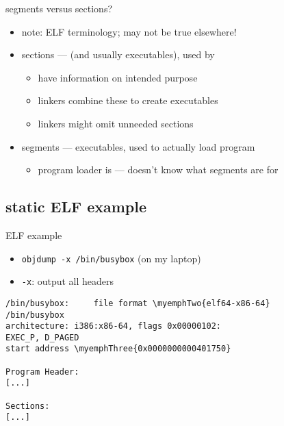 \begin{frame}{segments versus sections?}
\begin{itemize}
    \item note: ELF terminology; may not be true elsewhere!
    \item sections ---  {\small (and usually executables)}, used by 
        \begin{itemize}
        \item have information on intended purpose
        \item linkers combine these to create executables
        \item linkers might omit unneeded sections
        \end{itemize}
    \item segments --- executables, used to actually load program
        \begin{itemize}
        \item program loader is  --- doesn't know what segments are for
        \end{itemize}
\end{itemize}
\end{frame}

\subsection{static ELF example}
\newcommand{\myemphTwo}[1]{\myemph<2>{#1}}
\newcommand{\myemphTwoB}[1]{\myemph<2>{\textbf<2>{#1}}}
\newcommand{\myemphThree}[1]{\myemph<3>{#1}}
\newcommand{\myemphFour}[1]{\myemph<4>{#1}}
\newcommand{\myemphFive}[1]{\myemph<5>{#1}}
\newcommand{\myemphSix}[1]{\myemph<6>{#1}}
\newcommand{\myemphSeven}[1]{\myemph<7>{#1}}

\begin{frame}[fragile,label=elfExOver1]{ELF example}
    \begin{itemize}
    \item {\tt objdump -x /bin/busybox} (on my laptop)
    \item {\tt -x}: output all headers
    \end{itemize}
\begin{Verbatim}[commandchars=\\\{\},fontsize=\small]
/bin/busybox:     file format \myemphTwo{elf64-x86-64}
/bin/busybox
architecture: i386:x86-64, flags 0x00000102:
EXEC_P, D_PAGED
start address \myemphThree{0x0000000000401750}

Program Header:
[...]

Sections:
[...]
\end{Verbatim}
\end{frame}

